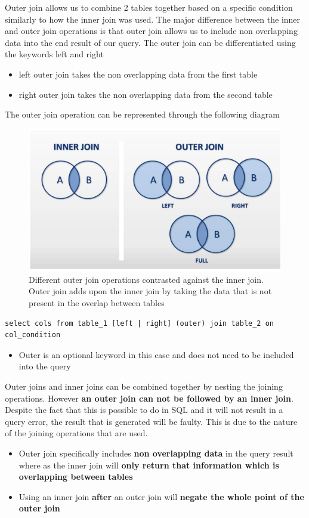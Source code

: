 \documentclass{article}
\begin{document}
Outer join allows us to combine 2 tables together based on a specific condition similarly to how the inner join was used.
The major difference between the inner and outer join operations is that outer join allows us to include non overlapping data into the end result of our query.
The outer join can be differentiated using the keywords left and right
\begin{itemize}
    \item left outer join takes the non overlapping data from the first table 
    \item right outer join takes the non overlapping data from the second table 
\end{itemize}
The outer join operation can be represented through the following diagram
\begin{figure}
    \centering
    \includegraphics[width=\linewidth]{img/Outer-Join.jpg}
    \caption{Different outer join operations contrasted against the inner join. Outer join adds upon the inner join by taking the data that is not present in the overlap between tables}
\end{figure}

\begin{lstlisting}[frame=single]
    select cols from table_1 [left | right] (outer) join table_2 on col_condition
\end{lstlisting}
\begin{itemize}
    \item Outer is an optional keyword in this case and does not need to be included into the query
\end{itemize}

Outer joins and inner joins can be combined together by nesting the joining operations. However \textbf{an outer join can not be followed by an inner join}. Despite the fact that this is possible to do in SQL and it will not result in a query error, the result that is generated will be faulty.
This is due to the nature of the joining operations that are used.
\begin{itemize}
    \item Outer join specifically includes \textbf{non overlapping data} in the query result where as the inner join will \textbf{only return that information which is overlapping between tables}
    \item Using an inner join \textbf{after} an outer join will \textbf{negate the whole point of the outer join}
\end{itemize}
\end{document}
